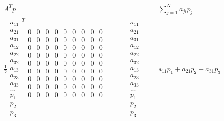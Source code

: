 \documentclass{article}
\begin{document}
\begin{eqnarray*}
A^{T}p &=&\sum_{j=1}^{N}a_{ji}p_{j} \\
\frac{1}{2}%
\begin{array}{c}
a_{11} \\ 
a_{21} \\ 
a_{31} \\ 
a_{12} \\ 
a_{22} \\ 
a_{32} \\ 
a_{13} \\ 
a_{23} \\ 
a_{33} \\ 
... \\ 
p_{1} \\ 
p_{2} \\ 
p_{3}%
\end{array}%
^{T}%
\begin{array}{ccccccccccccc}
0 & 0 & 0 & 0 & 0 & 0 & 0 & 0 & 0 &  &  &  &  \\ 
0 & 0 & 0 & 0 & 0 & 0 & 0 & 0 & 0 &  &  &  &  \\ 
0 & 0 & 0 & 0 & 0 & 0 & 0 & 0 & 0 &  &  &  &  \\ 
0 & 0 & 0 & 0 & 0 & 0 & 0 & 0 & 0 &  &  &  &  \\ 
0 & 0 & 0 & 0 & 0 & 0 & 0 & 0 & 0 &  &  &  &  \\ 
0 & 0 & 0 & 0 & 0 & 0 & 0 & 0 & 0 &  &  &  &  \\ 
0 & 0 & 0 & 0 & 0 & 0 & 0 & 0 & 0 &  &  &  &  \\ 
0 & 0 & 0 & 0 & 0 & 0 & 0 & 0 & 0 &  &  &  &  \\ 
0 & 0 & 0 & 0 & 0 & 0 & 0 & 0 & 0 &  &  &  &  \\ 
&  &  &  &  &  &  &  &  &  &  &  &  \\ 
&  &  &  &  &  &  &  &  &  &  &  &  \\ 
&  &  &  &  &  &  &  &  &  &  &  &  \\ 
&  &  &  &  &  &  &  &  &  &  &  & 
\end{array}%
\begin{array}{c}
a_{11} \\ 
a_{21} \\ 
a_{31} \\ 
a_{12} \\ 
a_{22} \\ 
a_{32} \\ 
a_{13} \\ 
a_{23} \\ 
a_{33} \\ 
... \\ 
p_{1} \\ 
p_{2} \\ 
p_{3}%
\end{array}
&=&a_{11}p_{1}+a_{21}p_{2}+a_{31}p_{3}
\end{eqnarray*}%
\end{document}
